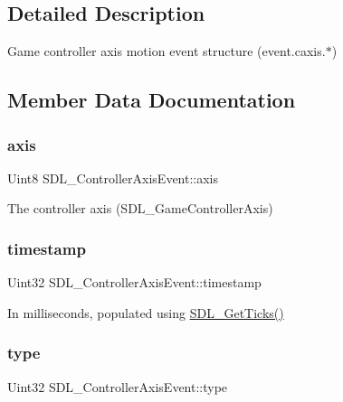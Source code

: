 \subsection{Detailed Description}
Game controller axis motion event structure (event.\+caxis.$\ast$) 

\subsection{Member Data Documentation}
\mbox{\label{struct_s_d_l___controller_axis_event_aba6543c143521aebce06a41a8cf79db0}} 
\subsubsection{\texorpdfstring{axis}{axis}}
{\footnotesize\ttfamily Uint8 S\+D\+L\+\_\+\+Controller\+Axis\+Event\+::axis}

The controller axis (S\+D\+L\+\_\+\+Game\+Controller\+Axis) \mbox{\label{struct_s_d_l___controller_axis_event_afc92dba0b4d1652a1ecf9e85606d1f14}} 
\subsubsection{\texorpdfstring{timestamp}{timestamp}}
{\footnotesize\ttfamily Uint32 S\+D\+L\+\_\+\+Controller\+Axis\+Event\+::timestamp}

In milliseconds, populated using \mbox{\hyperlink{_s_d_l__timer_8h_a0b9bc71d6287e0ffafdc3419760fe2b3}{S\+D\+L\+\_\+\+Get\+Ticks()}} \mbox{\label{struct_s_d_l___controller_axis_event_aa904b61e4763d28d887cf8afcc3cbb7c}} 
\subsubsection{\texorpdfstring{type}{type}}
{\footnotesize\ttfamily Uint32 S\+D\+L\+\_\+\+Controller\+Axis\+Event\+::type}

